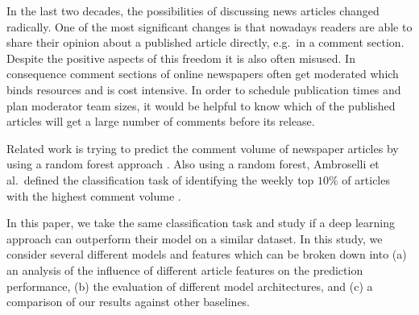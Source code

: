 In the last two decades, the possibilities of discussing news articles changed radically.
One of the most significant changes is that nowadays readers are able to share their opinion about a published article directly, e.g.\ in a comment section.
Despite the positive aspects of this freedom it is also often misused.
In consequence comment sections of online newspapers often get moderated which binds resources and is cost intensive.
In order to schedule publication times and plan moderator team sizes, it would be helpful to know which of the published articles will get a large number of comments before its release.

Related work is trying to predict the comment volume of newspaper articles by using a random forest approach \cite{tsagkias2009predicting}.
Also using a random forest, Ambroselli et al.\ defined the classification task of identifying the weekly top $10\%$ of articles with the highest comment volume \cite{ambroselli2018prediction}.

In this paper, we take the same classification task and study if a deep learning approach can outperform their model on a similar dataset.
In this study, we consider several different models and features which can be broken down into (a) an analysis of the influence of different article features on the prediction performance, (b) the evaluation of different model architectures, and (c) a comparison of our results against other baselines.
